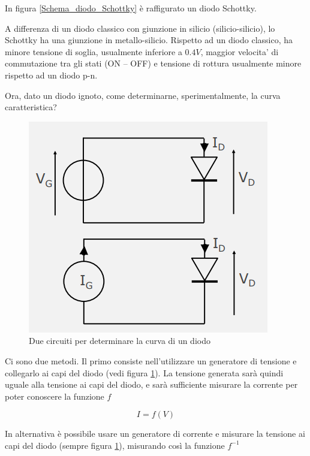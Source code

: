 \documentclass{article}
\begin{document}
In figura \ref{Schema_diodo_Schottky} è raffigurato un diodo Schottky.

\vspace{1mm}

A differenza di un diodo classico con giunzione in silicio (silicio-silicio), lo Schottky ha una giunzione in metallo-silicio. Rispetto ad un diodo classico, ha minore tensione di soglia, usualmente inferiore a $0.4 V$, maggior velocita’ di commutazione tra gli stati (ON – OFF) e tensione di rottura usualmente minore rispetto ad un diodo p-n.

\vspace{3mm}

Ora, dato un diodo ignoto, come determinarne, sperimentalmente, la curva caratteristica?

\begin{figure}[h]
  \centering
  \includegraphics[scale=0.7]{IM_diodo_misura}
  \caption{Due circuiti per determinare la curva di un diodo}
  \label{Schema_diodo_misura}
\end{figure}

Ci sono due metodi. Il primo consiste nell'utilizzare un generatore di tensione e collegarlo ai capi del diodo (vedi figura \ref{Schema_diodo_misura}). La tensione generata sarà quindi uguale alla tensione ai capi del diodo, e sarà sufficiente misurare la corrente per poter conoscere la funzione $f$

\[I = f(V)\]

In alternativa è possibile usare un generatore di corrente e misurare la tensione ai capi del diodo (sempre figura \ref{Schema_diodo_misura}), misurando così la funzione $f^{-1}$
\end{document}
